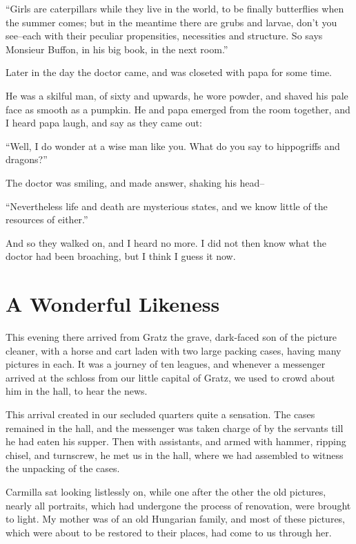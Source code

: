 \documentclass[11pt,twoside,makeidx,hidelinks,]{memoir}
\begin{document}
``Girls are caterpillars while they live in the world, to be finally
butterflies when the summer comes; but in the meantime there are grubs
and larvae, don't you see--each with their peculiar propensities,
necessities and structure. So says Monsieur Buffon, in his big book, in
the next room.''

Later in the day the doctor came, and was closeted with papa for some
time.

He was a skilful man, of sixty and upwards, he wore powder, and shaved
his pale face as smooth as a pumpkin. He and papa emerged from the room
together, and I heard papa laugh, and say as they came out:

``Well, I do wonder at a wise man like you. What do you say to
hippogriffs and dragons?''

The doctor was smiling, and made answer, shaking his head--

``Nevertheless life and death are mysterious states, and we know little
of the resources of either.''

And so they walked on, and I heard no more. I did not then know what the
doctor had been broaching, but I think I guess it now.

\pbreak{}

\chapter{A Wonderful Likeness}\hypertarget{a-wonderful-likeness}{}\label{a-wonderful-likeness}

This evening there arrived from Gratz the grave, dark-faced son of the
picture cleaner, with a horse and cart laden with two large packing
cases, having many pictures in each. It was a journey of ten leagues,
and whenever a messenger arrived at the schloss from our little capital
of Gratz, we used to crowd about him in the hall, to hear the news.

This arrival created in our secluded quarters quite a sensation. The
cases remained in the hall, and the messenger was taken charge of by the
servants till he had eaten his supper. Then with assistants, and armed
with hammer, ripping chisel, and turnscrew, he met us in the hall, where
we had assembled to witness the unpacking of the cases.

Carmilla sat looking listlessly on, while one after the other the old
pictures, nearly all portraits, which had undergone the process of
renovation, were brought to light. My mother was of an old Hungarian
family, and most of these pictures, which were about to be restored to
their places, had come to us through her.
\end{document}
